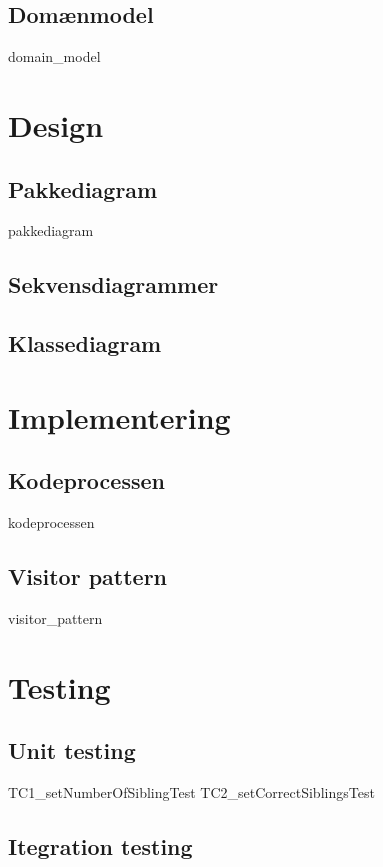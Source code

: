 \documentclass{article}
\begin{document}
{\subsection{Domænmodel}
{domain_model}
\newpage

\section{Design}

\subsection{Pakkediagram}
{pakkediagram}
\newpage
\subsection{Sekvensdiagrammer}
\subsection{Klassediagram}

\section{Implementering}
\subsection{Kodeprocessen}
{kodeprocessen}
\subsection{Visitor pattern}
{visitor_pattern}
\newpage
\section{Testing}
\subsection{Unit testing}
{TC1_setNumberOfSiblingTest}
{TC2_setCorrectSiblingsTest}
\subsection{Itegration testing}

}
\end{document}
